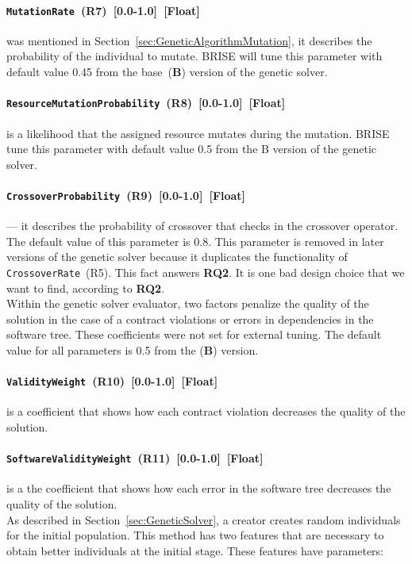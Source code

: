 \paragraph{\texttt{MutationRate}~(R7)~[0.0-1.0]~[Float]} was mentioned in Section~\ref{sec:GeneticAlgorithmMutation}, it describes the probability of the individual to mutate. BRISE will tune this parameter with default value 0.45 from the base~(\textbf{B}) version of the genetic solver.
\paragraph{\texttt{ResourceMutationProbability}~(R8)~[0.0-1.0]~[Float]} is a likelihood that the assigned resource mutates during the mutation. BRISE tune this parameter with default value 0.5 from the B version of the genetic solver.
\paragraph{\texttt{CrossoverProbability}~(R9)~[0.0-1.0]~[Float]} — it describes the probability of crossover that checks in the crossover operator. The default value of this parameter is 0.8. This parameter is removed in later versions of the genetic solver because it duplicates the functionality of \texttt{CrossoverRate}~(R5). This fact answers \textbf{RQ2}. It is one bad design choice that we want to find, according to \textbf{RQ2}.\\ 


Within the genetic solver evaluator, two factors penalize the quality of the solution in the case of a contract violations or errors in dependencies in the software tree. These coefficients were not set for external tuning. The default value for all parameters is 0.5 from the (\textbf{B}) version.
\paragraph{\texttt{ValidityWeight}~(R10)~[0.0-1.0]~[Float]} is a coefficient that shows how each contract violation decreases the quality of the solution.
\paragraph{\texttt{SoftwareValidityWeight}~(R11)~[0.0-1.0]~[Float]} is a the coefficient that shows how each error in the software tree decreases the quality of the solution.\\

As described in Section~\ref{sec:GeneticSolver}, a creator creates random individuals for the initial population.
This method has two features that are necessary to obtain better individuals at the initial stage. These features have parameters:
